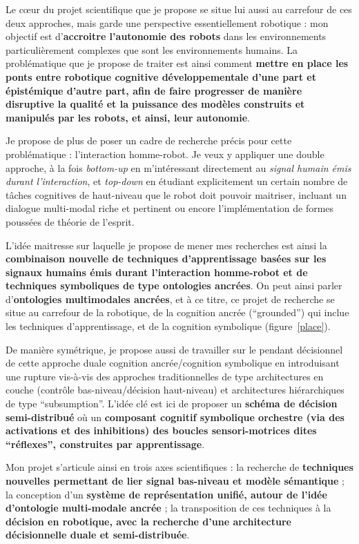 \documentclass[a4paper]{article}
\begin{document}
Le c\oe ur du projet scientifique que je propose se situe lui aussi au carrefour
de ces deux approches, mais garde une perspective essentiellement robotique :
mon objectif est d'\textbf{accroitre l'autonomie des robots} dans les
environnements particulièrement complexes que sont les environnements humains.
La problématique que je propose de traiter est ainsi comment \textbf{mettre en
place les ponts entre robotique cognitive développementale d'une part et
épistémique d'autre part, afin de faire progresser de manière disruptive la
qualité et la puissance des modèles construits et manipulés par les robots, et
ainsi, leur autonomie}.

Je propose de plus de poser un cadre de recherche précis pour cette
problématique : l'interaction homme-robot. Je veux y appliquer une double
approche, à la fois \emph{bottom-up} en m'intéressant directement au
\emph{signal humain émis durant l'interaction}, et \emph{top-down} en étudiant
explicitement un certain nombre de tâches cognitives de haut-niveau que le robot
doit pouvoir maitriser, incluant un dialogue multi-modal riche et pertinent ou
encore l'implémentation de formes poussées de théorie de l'esprit.

L'idée maitresse sur laquelle je propose de mener mes recherches est ainsi la
\textbf{combinaison nouvelle de techniques d'apprentissage basées sur les
signaux humains émis durant l'interaction homme-robot et de techniques
symboliques de type ontologies ancrées}. On peut ainsi parler
d'\textbf{ontologies multimodales ancrées}, et à ce titre, ce projet de
recherche se situe au carrefour de la robotique, de la cognition ancrée
(``grounded'') qui inclue les techniques d'apprentissage, et de la cognition
symbolique (figure~\ref{place}).

De manière symétrique, je propose aussi de travailler sur le pendant décisionnel
de cette approche duale cognition ancrée/cognition symbolique en introduisant
une rupture vis-à-vis des approches traditionnelles de type architectures en
couche (contrôle bas-niveau/décision haut-niveau) et architectures
hiérarchiques de type ``subsumption''. L'idée clé est ici de proposer un
\textbf{schéma de décision semi-distribué} où un \textbf{composant cognitif
symbolique orchestre (via des activations et des inhibitions) des boucles
sensori-motrices dites ``réflexes'', construites par apprentissage}.

Mon projet s'articule ainsi en trois axes scientifiques : la recherche de
\textbf{techniques nouvelles permettant de lier signal bas-niveau et modèle
sémantique} ; la conception d'un \textbf{système de représentation unifié,
autour de l'idée d'ontologie multi-modale ancrée} ; la transposition de ces
techniques à la \textbf{décision en robotique, avec la recherche d'une
architecture décisionnelle duale et semi-distribuée}.
\end{document}
